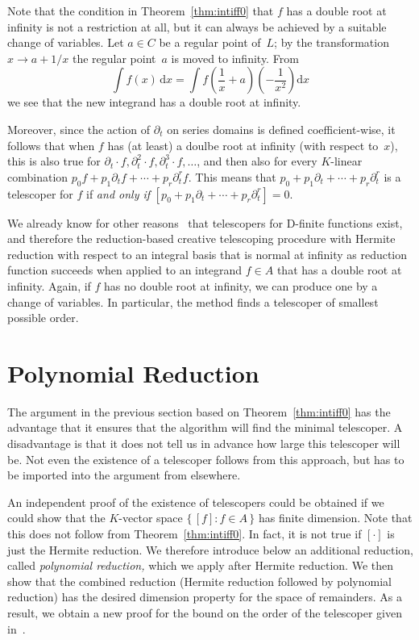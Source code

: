 \documentclass{sig-alternate}
\begin{document}
Note that the condition in Theorem~\ref{thm:intiff0} that $f$ has a double
root at infinity is not a restriction at all, but it can always be achieved by
a suitable change of variables. Let $a\in C$ be a regular point of~$L$; by
the transformation $x\to a+1/x$ the regular point~$a$ is moved to
infinity. From
\[
  \int f(x) \,\mathrm{d}x = \int f\left(\frac{1}{x}+a\right)\left(-\frac{1}{x^2}\right) \mathrm{d}x
\]
we see that the new integrand has a double root at infinity.

Moreover, since the action of $\partial_t$ on series domains is defined coefficient-wise,
it follows that when $f$ has (at least) a doulbe root at infinity (with respect to~$x$), 
this is also true for $\partial_t\cdot f, \partial_t^2\cdot f, \partial_t^3\cdot f,\dots$,
and then also for every $K$-linear combination $p_0f+p_1\partial_tf+\cdots+p_r\partial_t^rf$.
This means that $p_0+p_1\partial_t+\cdots+p_r\partial_t^r$ is a telescoper for $f$ if
\emph{and only if} $[p_0+p_1\partial_t+\cdots+p_r\partial_t^r]=0$.

We already know for other reasons~\cite{Zeilberger1990,chyzak00} that
telescopers for D-finite functions exist, and therefore the reduction-based
creative telescoping procedure with Hermite reduction with respect to an
integral basis that is normal at infinity as reduction function succeeds when
applied to an integrand $f\in A$ that has a double root at infinity. Again, if
$f$ has no double root at infinity, we can produce one by a change of variables.
In particular, the method finds a telescoper of smallest possible order.

\section{Polynomial Reduction}\label{sec:polynomial}

The argument in the previous section based on Theorem~\ref{thm:intiff0}
has the advantage that it ensures that the algorithm will find the minimal telescoper.
A disadvantage is that it does not tell us in advance how large this telescoper will be.
Not even the existence of a telescoper follows from this approach, but has to be imported
into the argument from elsewhere.

An independent proof of the existence of telescopers could be obtained if we could show
that the $K$-vector space $\{\,[f]:f\in A\,\}$ has finite dimension. Note that this does
not follow from Theorem~\ref{thm:intiff0}. In fact, it is not true if $[\cdot]$ is just
the Hermite reduction. We therefore introduce below an additional reduction, called
\emph{polynomial reduction,} which we apply after Hermite reduction. We then show that
the combined reduction (Hermite reduction followed by polynomial reduction) has the
desired dimension property for the space of remainders. As a result, we obtain a new
proof for the bound on the order of the telescoper given in~\cite{chen14a}.
\end{document}
